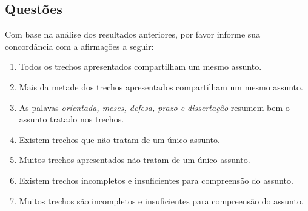 \newpage

\subsection*{Questões}


Com base na análise dos resultados anteriores, por favor informe sua concordância com a afirmações a seguir:





\begin{enumerate}

\item Todos os trechos apresentados compartilham um mesmo assunto.
\likert

\item Mais da metade dos trechos apresentados compartilham um mesmo assunto.
\likert

\item As palavas \textit{orientada, meses, defesa, prazo e dissertação} resumem bem o assunto tratado nos trechos.
\likert

\item Existem trechos que não tratam de um único assunto.
\likert

\item Muitos trechos apresentados não tratam de um único assunto. 
\likert

\item Existem trechos incompletos e insuficientes para compreensão do assunto.
\likert

\item Muitos trechos são incompletos e insuficientes para compreensão do assunto.
\likert



\end{enumerate}







